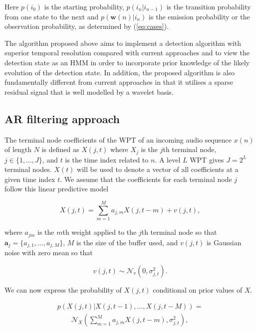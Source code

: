 Here $p(i_{0})$ is the starting probability, $p(i_n | i_{n-1})$ is the transition probability from one state to the next and $p(\boldsymbol{w}(n) | i_n)$ is the emission probability or the observation probability, as determined by (\ref{eq:cases}).

The algorithm proposed above aims to implement a detection algorithm with superior temporal resolution compared with current approaches and to view the detection state as an HMM in order to incorporate prior knowledge of the likely evolution of the detection state. In addition, the proposed algorithm is also fundamentally different from current approaches in that it utilises a sparse residual signal that is well modelled by a wavelet basis.

\subsection{AR filtering approach}\label{sec:WPdetectionAR}

The terminal node coefficients of the WPT of an incoming audio sequence $x(n)$ of length $N$ is defined as $X(j,t)$ where $X_j$ is the $j$th terminal node, $j \in \{1, \ldots, J\}$, and $t$ is the time index related to $n$. A level $L$ WPT gives $J = 2^L$ terminal nodes. $X(t)$ will be used to denote a vector of all coefficients at a given time index $t$. We assume that the coefficients for each terminal node $j$ follow this linear predictive model

\begin{equation}\label{eq:lpm}
X(j,t) = \sum_{m=1}^{M} a_{j,m} X(j,t - m) + v(j,t),
\end{equation}

where $a_{jm}$ is the $m$th weight applied to the $j$th terminal node so that $\mathbf{a}_j = \{a_{j,1}, \ldots, a_{j,M} \}$, $M$ is the size of the buffer used, and $v(j,t)$ is Gaussian noise with zero mean so that

\begin{equation}\label{eq:lpmnoise}
v(j,t) \sim \mathcal{N}_v(0,\sigma^2_{j,t}).
\end{equation}

We can now express the probability of $X(j,t)$ conditional on prior values of $X$.

\begin{align}\label{eq:likelihood}
p\left(X\left(j,t\right)|X\left(j,t-1\right),\ldots,X\left(j,t-M\right)\right) = \nonumber\\
\qquad \mathcal{N}_X\left( \sum_{m=1}^M a_{j,m} X(j,t - m), \sigma_{j,t}^2\right),
\end{align}

